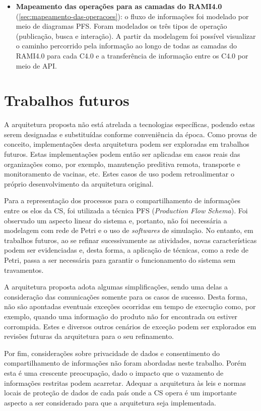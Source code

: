 \begin{itemize}
	\item \textbf{Mapeamento das operações para as camadas do RAMI4.0} (\autoref{sec:mapeamento-das-operacoes}): o fluxo de informações foi modelado por meio de diagramas PFS. Foram modelados os três tipos de operação (publicação, busca e interação). A partir da modelagem foi possível visualizar o caminho percorrido pela informação ao longo de todas as camadas do RAMI4.0 para cada C4.0 e a transferência de informação entre os C4.0 por meio de API.
\end{itemize}

\section{Trabalhos futuros}

A arquitetura proposta não está atrelada a tecnologias específicas, podendo estas serem designadas e substituídas conforme conveniência da época. Como provas de conceito, implementações desta arquitetura podem ser exploradas em trabalhos futuros. Estas implementações podem então ser aplicadas em casos reais das organizações como, por exemplo, manutenção preditiva remota, transporte e monitoramento de vacinas, etc. Estes casos de uso podem retroalimentar o próprio desenvolvimento da arquitetura original.

Para a representação dos processos para o compartilhamento de informações entre os elos da CS, foi utilizada a técnica PFS (\textit{Production Flow Schema}). Foi observado um aspecto linear do sistema e, portanto, não foi necessária a modelagem com rede de Petri e o uso de \textit{softwares} de simulação. No entanto, em trabalhos futuros, ao se refinar sucessivamente as atividades, novas características podem ser evidenciadas e, desta forma, a aplicação de técnicas, como a rede de Petri, passa a ser necessária para garantir o funcionamento do sistema sem travamentos.

A arquitetura proposta adota algumas simplificações, sendo uma delas a consideração das comunicações somente para os casos de sucesso. Desta forma, não são apontadas eventuais exceções ocorridas em tempo de execução como, por exemplo, quando uma informação do produto não for encontrada ou estiver corrompida. Estes e diversos outros cenários de exceção podem ser explorados em revisões futuras da arquitetura para o seu refinamento.

Por fim, considerações sobre privacidade de dados e consentimento do compartilhamento de informações não foram abordadas neste trabalho. Porém esta é uma crescente preocupação, dado o impacto que o vazamento de informações restritas podem acarretar. Adequar a arquitetura às leis e normas locais de proteção de dados de cada país onde a CS opera é um importante aspecto a ser considerado para que a arquitetura seja implementada.

